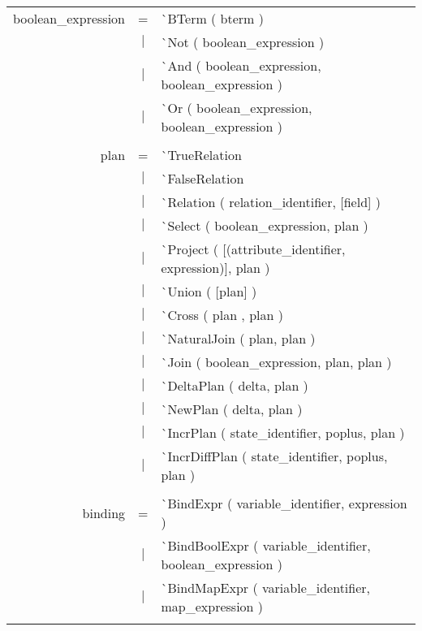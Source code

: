 \documentclass{article}
\begin{document}
\begin{tabular}[ht] {rcl}
boolean\_expression &=& \`{}BTerm ( bterm )\\
&$\lvert$ & \`{}Not ( boolean\_expression )\\
&$\lvert$ & \`{}And ( boolean\_expression,  boolean\_expression )\\
&$\lvert$ & \`{}Or ( boolean\_expression,  boolean\_expression )\\
\\
plan &=& \`{}TrueRelation\\
&$\lvert$ & \`{}FalseRelation\\
&$\lvert$ & \`{}Relation ( relation\_identifier, [field] )\\
&$\lvert$ & \`{}Select ( boolean\_expression, plan )\\
&$\lvert$ & \`{}Project ( [(attribute\_identifier, expression)], plan )\\
&$\lvert$ & \`{}Union ( [plan] )\\
&$\lvert$ & \`{}Cross ( plan , plan )\\
&$\lvert$ & \`{}NaturalJoin ( plan,  plan )\\
&$\lvert$ & \`{}Join ( boolean\_expression,  plan,  plan )\\
&$\lvert$ & \`{}DeltaPlan ( delta, plan )\\
&$\lvert$ & \`{}NewPlan ( delta, plan )\\
&$\lvert$ & \`{}IncrPlan ( state\_identifier, poplus, plan ) \\
&$\lvert$ & \`{}IncrDiffPlan ( state\_identifier, poplus, plan ) \\
\\
binding &=& \`{}BindExpr ( variable\_identifier,  expression )\\
&$\lvert$ & \`{}BindBoolExpr ( variable\_identifier,  boolean\_expression )\\
&$\lvert$ & \`{}BindMapExpr ( variable\_identifier, map\_expression ) \\
\\
\end{tabular}
\pagebreak
\end{document}
